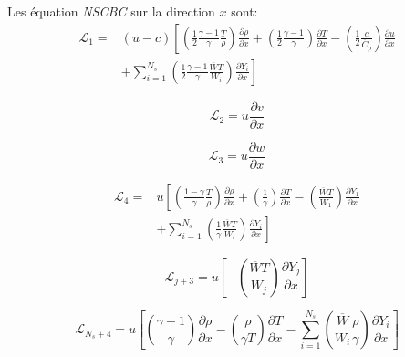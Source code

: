Les équation \textit{NSCBC} sur la direction $x$ sont:
\begin{equation}\label{eq:l1}
  \begin{split}
    \mathcal{L}_1=&(u-c)\left[ \left( \frac{1}{2} \frac{\gamma -1}{\gamma} \frac{T}{\rho} \right) \frac{\partial \rho}{\partial x} + \left( \frac{1}{2} \frac{\gamma -1}{\gamma} \right) \frac{\partial T}{\partial x}  -  \left( \frac{1}{2} \frac{c}{\overline{C}_p}  \right) \frac{\partial u}{\partial x} \right.\\
      &\left. + \sum_{i=1}^{N_s} \left(  \frac{1}{2} \frac{\gamma -1}{\gamma} \frac{\overline{W}T}{W_i} \right) \frac{\partial Y_i}{\partial x}   \right]
  \end{split}
\end{equation}

\begin{equation}\label{eq:l2}
  \mathcal{L}_2= u \frac{\partial v}{\partial x}
\end{equation}

\begin{equation}\label{eq:l3}
  \mathcal{L}_3= u \frac{\partial w}{\partial x}
\end{equation}

\begin{equation}
  \begin{split}
    \mathcal{L}_4=&u \left[ \left( \frac{1- \gamma}{\gamma} \frac{T}{\rho} \right) \frac{\partial \rho}{\partial x} + \left( \frac{1}{\gamma} \right) \frac{\partial T}{\partial x} - \left( \frac{\overline{W}T}{W_1} \right) \frac{\partial Y_1}{\partial x} \right. \\
      &\left. + \sum_{i=1}^{N_s} \left(  \frac{1}{\gamma} \frac{\overline{W}T}{W_i} \right) \frac{\partial Y_i}{\partial x}  \right]
    \end{split}
\end{equation}

\begin{equation}
  \mathcal{L}_{j+3}=u  \left[ - \left( \frac{\overline{W}T}{W_j} \right) \frac{\partial Y_j}{\partial x} \right]
\end{equation}

\begin{equation}
  \mathcal{L}_{N_s+4}=u \left[ \left( \frac{\gamma -1}{\gamma} \right) \frac{\partial \rho}{\partial x} - \left( \frac{\rho}{\gamma T} \right) \frac{\partial T}{\partial x} - \sum_{i=1}^{N_s} \left(  \frac{\overline{W}}{W_i} \frac{\rho}{\gamma} \right) \frac{\partial Y_i}{\partial x}  \right]
\end{equation}



